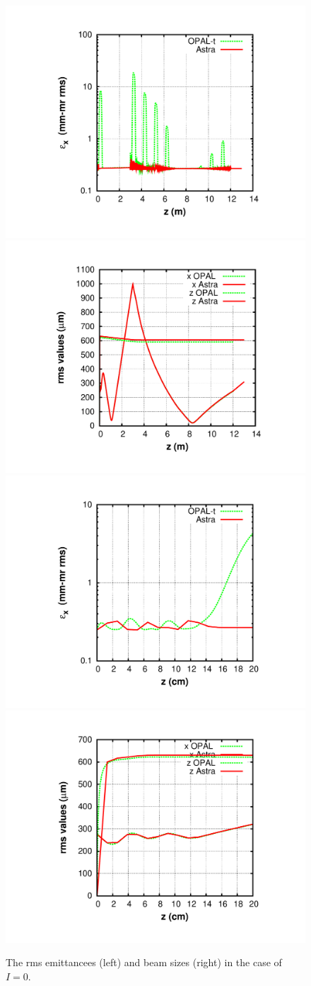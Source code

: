 \documentclass{psi-note}    %
\begin{document}
\begin{figure}[htbp]
\begin{center}
\includegraphics[width=.49\linewidth,angle=0]{figures/opal-astra-nosc-exrms-1}
\includegraphics[width=.49\linewidth,angle=0]{figures/opal-astra-nosc-xzrms-1}
\includegraphics[width=.49\linewidth,angle=0]{figures/opal-astra-nosc-exrms-2}
\includegraphics[width=.49\linewidth,angle=0]{figures/opal-astra-nosc-xzrms-2}

\caption{The rms emittancees (left) and beam sizes (right) in the case of $I=0$. }
\label{fig:opal-astra-nosc-rmsvals-1}
\end{center}
\end{figure}
\clearpage
\end{document}
